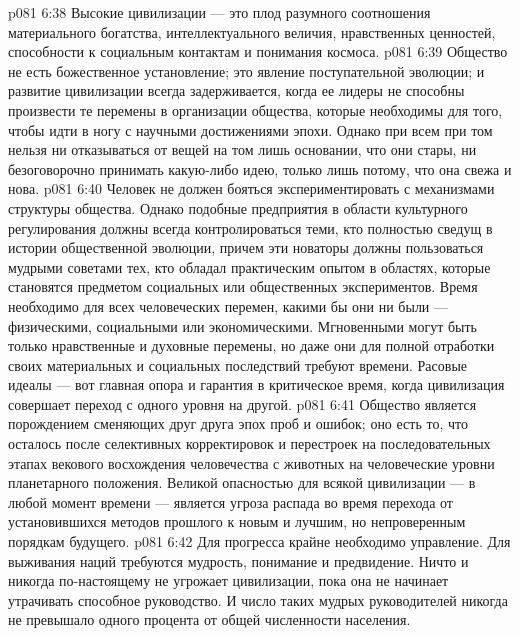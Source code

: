 \vs p081 6:38 Высокие цивилизации --- это плод разумного соотношения материального богатства, интеллектуального величия, нравственных ценностей, способности к социальным контактам и понимания космоса.
\vs p081 6:39 \pc {}\bibnobreakspace {} Общество не есть божественное установление; это явление поступательной эволюции; и развитие цивилизации всегда задерживается, когда ее лидеры не способны произвести те перемены в организации общества, которые необходимы для того, чтобы идти в ногу с научными достижениями эпохи. Однако при всем при том нельзя ни отказываться от вещей на том лишь основании, что они стары, ни безоговорочно принимать какую\hyp{}либо идею, только лишь потому, что она свежа и нова.
\vs p081 6:40 Человек не должен бояться экспериментировать с механизмами структуры общества. Однако подобные предприятия в области культурного регулирования должны всегда контролироваться теми, кто полностью сведущ в истории общественной эволюции, причем эти новаторы должны пользоваться мудрыми советами тех, кто обладал практическим опытом в областях, которые становятся предметом социальных или общественных экспериментов.  Время необходимо для всех человеческих перемен, какими бы они ни были --- физическими, социальными или экономическими. Мгновенными могут быть только нравственные и духовные перемены, но даже они для полной отработки своих материальных и социальных последствий требуют времени. Расовые идеалы --- вот главная опора и гарантия в критическое время, когда цивилизация совершает переход с одного уровня на другой.
\vs p081 6:41 \pc {}\bibnobreakspace {} Общество является порождением сменяющих друг друга эпох проб и ошибок; оно есть то, что осталось после селективных корректировок и перестроек на последовательных этапах векового восхождения человечества с животных на человеческие уровни планетарного положения. Великой опасностью для всякой цивилизации --- в любой момент времени --- является угроза распада во время перехода от установившихся методов прошлого к новым и лучшим, но непроверенным порядкам будущего.
\vs p081 6:42 Для прогресса крайне необходимо управление. Для выживания наций требуются мудрость, понимание и предвидение. Ничто и никогда по\hyp{}настоящему не угрожает цивилизации, пока она не начинает утрачивать способное руководство. И число таких мудрых руководителей никогда не превышало одного процента от общей численности населения.
